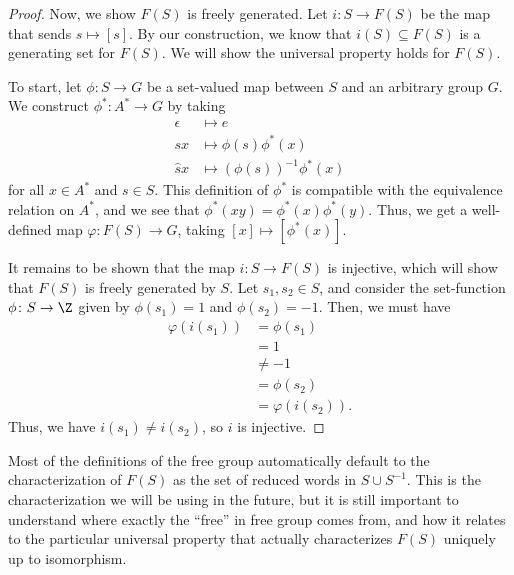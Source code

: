 \begin{proof}
  Now, we show $F(S)$ is freely generated. Let $i\colon S\rightarrow F(S)$ be the map that sends $s\mapsto \left[s\right]$. By our construction, we know that $i(S)\subseteq F(S)$ is a generating set for $F(S)$. We will show the universal property holds for $F(S)$.\newline

  To start, let $\phi\colon S\rightarrow G$ be a set-valued map between $S$ and an arbitrary group $G$. We construct $\phi^{\ast}\colon A^{\ast}\rightarrow G$ by taking
  \begin{align*}
    \epsilon &\mapsto e\\
    sx &\mapsto \phi(s)\phi^{\ast}\left(x\right)\\
    \hat{s}x &\mapsto \left(\phi(s)\right)^{-1}\phi^{\ast}\left(x\right)
  \end{align*}
  for all $x\in A^{\ast}$ and $s\in S$. This definition of $\phi^{\ast}$ is compatible with the equivalence relation on $A^{\ast}$, and we see that $\phi^{\ast}\left(xy\right) = \phi^{\ast}\left(x\right)\phi^{\ast}\left(y\right)$. Thus, we get a well-defined map $\varphi\colon F(S)\rightarrow G$, taking $\left[x\right]\mapsto \left[\phi^{\ast}\left(x\right)\right]$.\newline

  It remains to be shown that the map $i\colon S\rightarrow F(S)$ is injective, which will show that $F(S)$ is freely generated by $S$. Let $s_1,s_2\in S$, and consider the set-function $\phi\colon S\rightarrow \Z$ given by $\phi\left(s_1\right) = 1$ and $\phi\left(s_2\right) = -1$. Then, we must have
  \begin{align*}
    \varphi\left(i\left(s_1\right)\right) &= \phi\left(s_1\right)\\
                                          &= 1\\
                                          &\neq -1\\
                                          &= \phi\left(s_2\right)\\
                                          &= \varphi\left(i\left(s_2\right)\right).
  \end{align*}
  Thus, we have $i\left(s_1\right)\neq i\left(s_2\right)$, so $i$ is injective.
\end{proof}
Most of the definitions of the free group automatically default to the characterization of $F(S)$ as the set of reduced words in $S\cup S^{-1}$. This is the characterization we will be using in the future, but it is still important to understand where exactly the ``free'' in free group comes from, and how it relates to the particular universal property that actually characterizes $F(S)$ uniquely up to isomorphism.

